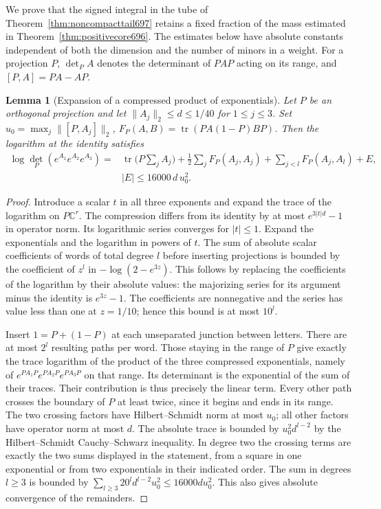\documentclass[a4paper,11pt]{article}
\newtheorem{lemma}[proposition]{Lemma}
\theoremstyle{definition}
\theoremstyle{remark}
\numberwithin{equation}{section}
\begin{document}
We prove that the signed integral in the tube of
Theorem~\ref{thm:noncompacttail697} retains a fixed fraction
of the mass estimated in Theorem~\ref{thm:positivecore696}.
The estimates below have absolute constants independent of
both the dimension and the number of minors in a weight.
For a projection \(P\), \(\det_P A\) denotes the determinant
of \(PAP\) acting on its range, and \([P,A]=PA-AP\).

\begin{lemma}[Expansion of a compressed product of exponentials]\leavevmode
\label{lem:compressedproduct698}
Let \(P\) be an orthogonal projection and let
\(\|A_j\|_2\le d\le1/40\) for \(1\le j\le3\).
Set \(u_0=\max_j\|[P,A_j]\|_2\),
\(F_P(A,B)=\operatorname{tr}(PA(1-P)BP)\). Then the
logarithm at the identity satisfies
\[
 \begin{split}
 \log\det_P(e^{A_1}e^{A_2}e^{A_3})
  ={}&\operatorname{tr}\bigl(P\textstyle\sum_j A_j\bigr)
      +\tfrac12\sum_j F_P(A_j,A_j)
      +\sum_{j<l}F_P(A_j,A_l)+E,\\
 & |E|\le 16000\,d\,u_0^2 .
 \end{split}
\]
\end{lemma}
\begin{proof}
Introduce a scalar \(t\) in all three exponents and expand
the trace of the logarithm on \(P\mathbb C^r\).
The compression differs from its identity by at most
\(e^{3|t|d}-1\) in operator norm. Its logarithmic series
converges for \(|t|\le1\). Expand the exponentials and the
logarithm in powers of \(t\). The sum of absolute scalar
coefficients of words of total degree \(l\) before inserting
projections is bounded by the coefficient of \(z^l\) in
\(-\log(2-e^{3z})\). This follows by replacing the
coefficients of the logarithm by their absolute values:
the majorizing series for its argument minus the identity
is \(e^{3z}-1\). The coefficients are nonnegative and the
series has value less than one at \(z=1/10\); hence this
bound is at most \(10^l\).

Insert \(1=P+(1-P)\) at each unseparated junction between
letters. There are at most \(2^l\) resulting paths per word.
Those staying in the range of \(P\) give exactly the
trace logarithm of the product of the three compressed
exponentials, namely of \(e^{P A_1 P}e^{P A_2 P}e^{P A_3 P}\)
on that range. Its determinant is the exponential of the
sum of their traces. Their contribution is thus precisely
the linear term. Every other path crosses the boundary of
\(P\) at least twice, since it begins and ends in its range.
The two crossing factors have Hilbert--Schmidt norm at most
\(u_0\); all other factors have operator norm at most \(d\).
The absolute trace is bounded by \(u_0^2d^{l-2}\) by the
Hilbert--Schmidt Cauchy--Schwarz inequality. In degree
two the crossing terms are exactly the two sums displayed
in the statement, from a square in one exponential or
from two exponentials in their indicated order. The sum in
degrees \(l\ge3\) is bounded by
\(\sum_{l\ge3}20^l d^{l-2}u_0^2\le16000d u_0^2\).
This also gives absolute convergence of the remainders.
\end{proof}
\end{document}
